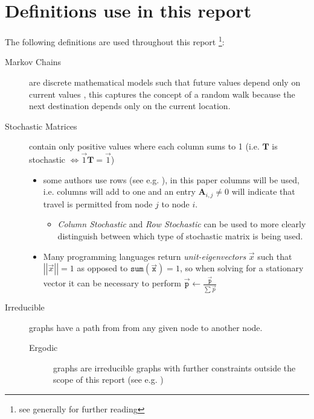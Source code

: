 \documentclass[11pt, twoside]{report}
\begin{document}
\section{Definitions use in this report}
\label{definitions}
The following definitions are used throughout this report \footnote{see generally \cite[Ch. 15]{langvilleGooglePageRankScience2012} for further reading}:

\begin{description}
\item[{Markov Chains}] are discrete mathematical models such that future values depend only on current values \cite[]{larsonElementaryLinearAlgebra1991}, this captures the concept of a random walk because the next destination depends only on the current location.
\item[{Stochastic Matrices}] contain only positive values where each column sums to 1 \cite{langvilleGooglePageRankScience2012,larsonElementaryLinearAlgebra1991} (i.e. \(\mathbf{T}\) is stochastic \(\iff \vec{1}\mathbf{T} = \vec{1}\))
\begin{itemize}
\item some authors use rows (see e.g. \cite[]{langvilleGooglePageRankScience2012}), in this paper columns will be used, i.e. columns will add to one and an entry \(\mathbf{A}_{i,j} \neq 0\) will indicate that travel is permitted from node \(j\) to node \(i\).
\begin{itemize}
\item \emph{Column Stochastic} and \emph{Row Stochastic} can be used to more clearly distinguish between which type of stochastic matrix is being used.
\end{itemize}
\item Many programming languages return \emph{unit-eigenvectors} \(\vec{x}\) such that \(\left\lvert \left\lvert \vec{x} \right\rvert \right\rvert = 1\) as opposed to \(\mathtt{sum} \left( \vec{\mathtt{x}}\right) = 1\), so when solving for a stationary vector it can be necessary to perform \(\vec{\mathtt{p}} \leftarrow \frac{\vec{\mathtt{p}}}{\sum \vec{p}}\)
\end{itemize}
\item[{Irreducible}] graphs have a path from from any given node to another node. \cite[]{langvilleGooglePageRankScience2012}
\begin{description}
\item[{Ergodic}] graphs are irreducible graphs with further constraints outside
the scope of this report (see e.g.
\cite{nathanaelackermancameronfreeralexkruckmanandrehanapatelProperlyErodicStructures2017,chenEigenvaluesInequalitiesErgodic2005})

\end{description}
\end{description}
\end{document}
